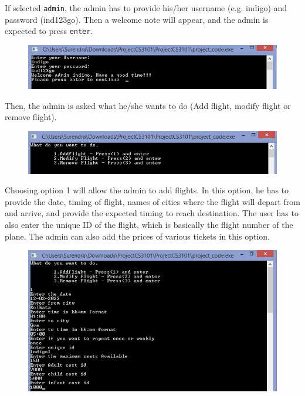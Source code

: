 \documentclass[12pt]{article}
\begin{document}
If selected \texttt{admin}, the admin has to provide his/her username (e.g. indigo) and password (ind123go). Then a welcome note will appear, and the admin is expected to press \texttt{enter}.

\begin{figure}[!h]
\centering
\includegraphics[scale=0.8]{ask for username}
\end{figure} 

Then, the admin is asked what he/she wants to do (Add flight, modify flight or remove flight).

\begin{figure}[!h]
\centering
\includegraphics[scale=0.8]{what to do}
\end{figure} 

Choosing option 1 will allow the admin to add flights. In this option, he has to provide the date, timing of flight, names of cities where the flight will depart from and arrive, and provide the expected timing to reach destination. The user has to also enter the unique ID of the flight, which is basically the flight number of the plane. The admin can also add the prices of various tickets in this option.

\begin{figure}[!h]
\centering
\includegraphics[scale=0.75]{addflight}
\end{figure} 
\pagebreak
\end{document}

